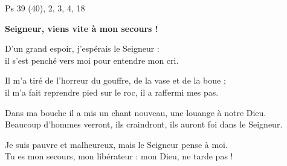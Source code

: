 Ps 39 (40), 2, 3, 4, 18

\textbf{Seigneur, viens vite à mon secours !}

\smallskip

D’un grand espoir,
j’espérais le Seigneur : \\
il s’est penché vers moi
pour entendre mon cri.

\smallskip

Il m’a tiré de l’horreur du gouffre,
de la vase et de la boue ; \\
il m’a fait reprendre pied sur le roc,
il a raffermi mes pas.

\smallskip

Dans ma bouche il a mis un chant nouveau,
une louange à notre Dieu. \\
Beaucoup d’hommes verront, ils craindront,
ils auront foi dans le Seigneur.

\smallskip

Je suis pauvre et malheureux,
mais le Seigneur pense à moi. \\
Tu es mon secours, mon libérateur :
mon Dieu, ne tarde pas !

